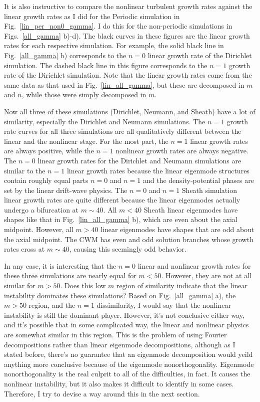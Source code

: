 It is also instructive to compare the nonlinear turbulent growth rates against the linear growth rates as I did for the Periodic simulation in Fig.~\ref{lin_per_non0_gamma}. I do this for
the non-periodic simulations in Figs.~\ref{all_gamma} b)-d). The black curves in these figures are the linear growth rates for each respective simulation. For example, the solid black line in
Fig.~\ref{all_gamma} b) corresponds to the $n=0$ linear growth rate of the Dirichlet simulation. The dashed black line in this figure corresponds to the $n=1$ growth rate of the Dirichlet simulation.
Note that the linear growth rates come from the same data as that used in Fig.~\ref{lin_all_gamma}, but these are decomposed in $m$ and $n$, while those were simply decomposed in $m$.

Now all three of these simulations (Dirichlet, Neumann, and Sheath) have a lot of similarity, especially the Dirichlet and Neumann simulations. The $n=1$ growth
rate curves for all three simulations are all qualitatively different between the linear and the nonlinear stage. For the most part, the $n=1$ linear growth rates are always positive, while
the $n=1$ nonlinear growth rates are always negative. The $n=0$ linear growth rates for the Dirichlet and Neumann simulations are similar to the $n=1$ linear growth rates because the linear
eigenmode structures contain roughly equal parts $n=0$ and $n=1$ and the density-potential phases are set by the linear drift-wave physics. The $n=0$ and $n=1$ Sheath simulation linear
growth rates are quite different because the linear eigenmodes actually undergo a bifurcation at $m \sim 40$. All $m <40$ Sheath linear eigenmodes have shapes like that in Fig.~\ref{lin_all_gamma} b),
which are even about the axial midpoint. However, all $m>40$ linear eigenmodes have shapes that are odd about the axial midpoint. The CWM has even and odd solution branches whose growth rates
cross at $m \sim 40$, causing this seemingly odd behavior.

In any case, it is interesting that the $n=0$ linear and nonlinear
growth rates for these three simulations are nearly equal for $m<50$. However, they are not at all similar for $m>50$. Does this low $m$ region of similarity indicate that the linear instability
dominates these simulations? Based on Fig.~\ref{all_gamma} a), the $m>50$ region, and the $n=1$ dissimilarity, I would say that the nonlinear instability is still the dominant player. However, it's
not conclusive either way, and it's possible that in some complicated way, the linear and nonlinear physics are somewhat similar in this region. This is the problem of using Fourier decompositions
rather than linear eigenmode decompositions, although as I stated before, there's no guarantee that an eigenmode decomposition would yeild anything more conclusive because of the eigenmode
nonorthogonality. Eigenmode nonorthogonality is the real culprit to all of the difficulties, in fact. It causes the nonlinear instability, but it also makes it difficult to identify in some cases.
Therefore, I try to devise a way around this in the next section.

